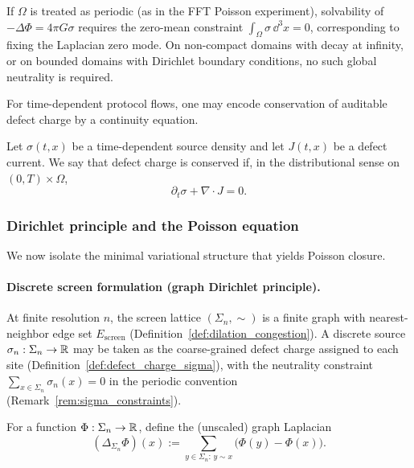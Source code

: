 \begin{remark}
\label{rem:sigma_constraints}
If $\Omega$ is treated as periodic (as in the FFT Poisson experiment), solvability of $-\Delta\Phi=4\pi G\sigma$ requires the zero-mean constraint $\int_\Omega \sigma\,\dd^3x=0$, corresponding to fixing the Laplacian zero mode.
On non-compact domains with decay at infinity, or on bounded domains with Dirichlet boundary conditions, no such global neutrality is required.
\end{remark}

For time-dependent protocol flows, one may encode conservation of auditable defect charge by a continuity equation.

\begin{definition}
\label{def:continuity_sigma}
Let $\sigma(t,x)$ be a time-dependent source density and let $J(t,x)$ be a defect current.
We say that defect charge is conserved if, in the distributional sense on $(0,T)\times\Omega$,
\[
\partial_t\sigma+\nabla\cdot J=0.
\]
\end{definition}

\subsubsection{Dirichlet principle and the Poisson equation}
\label{sec:dirichlet_principle}

We now isolate the minimal variational structure that yields Poisson closure.

\paragraph{Discrete screen formulation (graph Dirichlet principle).}
At finite resolution $n$, the screen lattice $(\Sigma_n,\sim)$ is a finite graph with nearest-neighbor edge set $E_{\mathrm{screen}}$ (Definition~\ref{def:dilation_congestion}).
A discrete source $\sigma_n:\Sigma_n\to\mathbb{R}$ may be taken as the coarse-grained defect charge assigned to each site (Definition~\ref{def:defect_charge_sigma}), with the neutrality constraint $\sum_{x\in\Sigma_n}\sigma_n(x)=0$ in the periodic convention (Remark~\ref{rem:sigma_constraints}).

\begin{definition}
\label{def:screen_graph_laplacian}
For a function $\Phi:\Sigma_n\to\mathbb{R}$, define the (unscaled) graph Laplacian
\[
(\Delta_{\Sigma_n}\Phi)(x):=\sum_{y\in\Sigma_n:\,y\sim x}\bigl(\Phi(y)-\Phi(x)\bigr).
\]
\end{definition}

